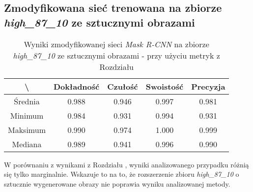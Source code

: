 \subsection{Zmodyfikowana sieć trenowana na zbiorze \textit{high\_87\_10} ze sztucznymi obrazami}
\label{sec:results_high_modified_generated}

\begin{table}[H]
	\centering
	\caption{Wyniki zmodyfikowanej sieci \textit{Mask R-CNN} na zbiorze \textit{high\_87\_10} ze sztucznymi obrazami - przy użyciu metryk z Rozdziału }
	\vspace{6pt}
	{\footnotesize
		\begin{tabular}{|c|c|c|c|c|}
      \hline \textbackslash & Dokładność & Czułość & Swoistość & Precyzja \\
      \hline Średnia & 0.988 & 0.946 & 0.997 & 0.981 \\
      \hline Minimum & 0.984 & 0.931 & 0.994 & 0.931 \\
      \hline Maksimum & 0.990 & 0.974 & 1.000 & 0.999 \\
      \hline Mediana & 0.989 & 0.941 & 0.996 & 0.990 \\
      \hline
		\end{tabular}
	}
  \vspace{0pt}
  \label{Tab:high_modified_generated_calculated}
\end{table}

W porównaniu z wynikami z Rozdziału , wyniki analizowanego przypadku różnią się tylko marginalnie. Wskazuje to na to, że rozszerzenie zbioru \textit{high\_87\_10} o sztucznie wygenerowane obrazy nie poprawia wyniku analizowanej metody.
